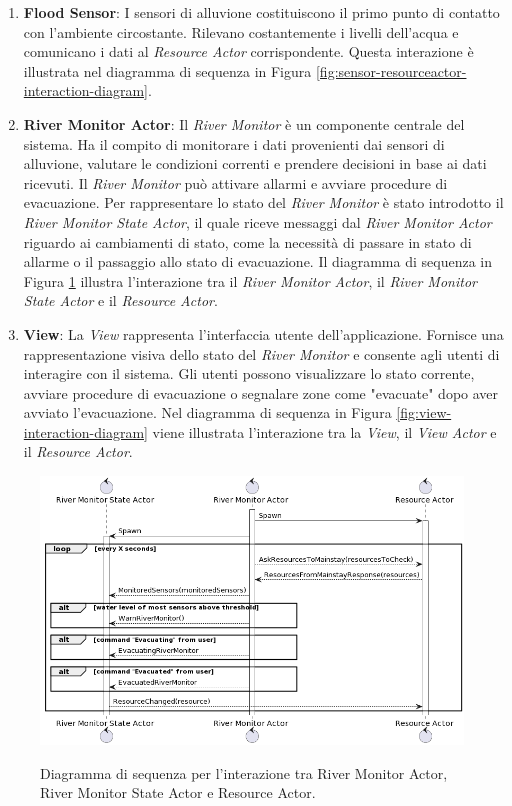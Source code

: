 \documentclass[12pt]{article}
\begin{document}
\begin{enumerate}
    \item \textbf{Flood Sensor}: I sensori di alluvione costituiscono il primo punto di contatto con l'ambiente circostante. Rilevano costantemente i livelli dell'acqua e comunicano i dati al \textit{Resource Actor} corrispondente. Questa interazione è illustrata nel diagramma di sequenza in Figura \ref{fig:sensor-resourceactor-interaction-diagram}.

    \item \textbf{River Monitor Actor}: Il \textit{River Monitor} è un componente centrale del sistema. Ha il compito di monitorare i dati provenienti dai sensori di alluvione, valutare le condizioni correnti e prendere decisioni in base ai dati ricevuti. Il \textit{River Monitor} può attivare allarmi e avviare procedure di evacuazione. Per rappresentare lo stato del \textit{River Monitor} è stato introdotto il \textit{River Monitor State Actor}, il quale riceve messaggi dal \textit{River Monitor Actor} riguardo ai cambiamenti di stato, come la necessità di passare in stato di allarme o il passaggio allo stato di evacuazione. Il diagramma di sequenza in Figura \ref{fig:rivermonitor-resourceactor-interaction-diagram} illustra l'interazione tra il \textit{River Monitor Actor}, il \textit{River Monitor State Actor} e il \textit{Resource Actor}.

    \item \textbf{View}: La \textit{View} rappresenta l'interfaccia utente dell'applicazione. Fornisce una rappresentazione visiva dello stato del \textit{River Monitor} e consente agli utenti di interagire con il sistema. Gli utenti possono visualizzare lo stato corrente, avviare procedure di evacuazione o segnalare zone come "evacuate" dopo aver avviato l'evacuazione. Nel diagramma di sequenza in Figura \ref{fig:view-interaction-diagram} viene illustrata l'interazione tra la \textit{View}, il \textit{View Actor} e il \textit{Resource Actor}.
\end{enumerate}

\begin{figure}[H]
    \caption{Diagramma di sequenza per l'interazione tra River Monitor Actor, River Monitor State Actor e Resource Actor.}
    \includegraphics[width=\textwidth]{../assets/images/rivermonitor-resourceactor-interaction-diagram.png}
    \label{fig:rivermonitor-resourceactor-interaction-diagram}
\end{figure}
\end{document}
